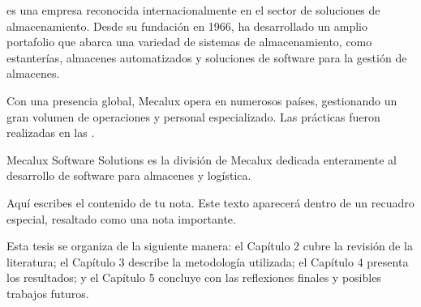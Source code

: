 

\href{https://www.mecalux.es/}{} es una empresa reconocida internacionalmente en el sector de soluciones de almacenamiento. Desde su fundación en 1966, ha desarrollado un amplio portafolio que abarca una variedad de sistemas de almacenamiento, como estanterías, almacenes automatizados y soluciones de software para la gestión de almacenes. 

Con una presencia global, Mecalux opera en numerosos países, gestionando un gran volumen de operaciones y personal especializado. Las prácticas fueron realizadas en las \href{https://maps.app.goo.gl/bJKvSNHAo5t1j4BZ6}{}.

Mecalux Software Solutions es la división de Mecalux dedicada enteramente al desarrollo de software para almacenes y logística.

\begin{notebox}
    Aquí escribes el contenido de tu nota. Este texto aparecerá dentro de un recuadro especial, resaltado como una nota importante.
  \end{notebox}

Esta tesis se organiza de la siguiente manera: el Capítulo 2 cubre la revisión de la literatura; el Capítulo 3 describe la metodología utilizada; el Capítulo 4 presenta los resultados; y el Capítulo 5 concluye con las reflexiones finales y posibles trabajos futuros.
